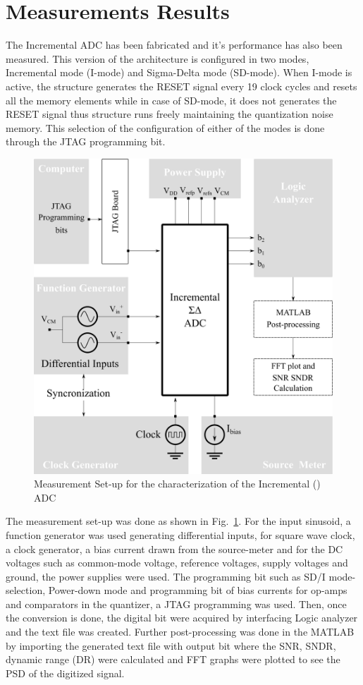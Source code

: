 \section{Measurements Results}
The Incremental {\textSigma}{\textDelta} ADC has been fabricated and it's performance has also been measured. This version of the architecture is configured in two modes, Incremental mode (I-mode) and Sigma-Delta mode (SD-mode). When I-mode is active, the structure generates the RESET signal every 19 clock cycles and resets all the memory elements while in case of SD-mode, it does not generates the RESET signal thus structure runs freely maintaining the quantization noise memory. This selection of the configuration of either of the modes is done through the JTAG programming bit. 
%
\begin{figure}[h!]
    \centering
    \includegraphics[width=0.85\columnwidth]{Chap06/Figures/sdm_measurement_setup.png}
    \caption{Measurement Set-up for the characterization of the Incremental (\textSigma \textDelta) ADC}
    \label{fig:meas_setup_iadc}
\end{figure}
%

The measurement set-up was done as shown in Fig.~\ref{fig:meas_setup_iadc}. For the input sinusoid, a function generator was used generating differential inputs, for square wave clock, a clock generator, a bias current drawn from the source-meter and for the DC voltages such as common-mode voltage, reference voltages, supply voltages and ground, the power supplies were used. The programming bit such as SD/I mode-selection, Power-down mode and programming bit of bias currents for op-amps and comparators in the quantizer, a JTAG programming was used. Then, once the conversion is done, the digital bit were acquired by interfacing Logic analyzer and the text file was created. Further post-processing was done in the MATLAB by importing the generated text file with output bit where the SNR, SNDR, dynamic range (DR) were calculated and FFT graphs were plotted to see the PSD of the digitized signal.

